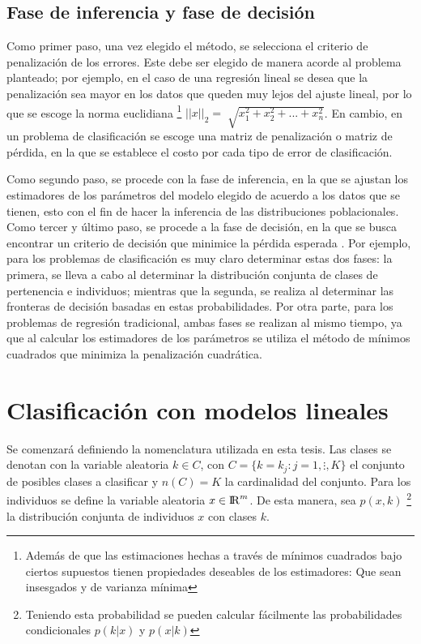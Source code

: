\subsection{Fase de inferencia y fase de decisión}

Como primer paso, una vez elegido el método, se selecciona el criterio de penalización de los errores. Este debe ser elegido de manera acorde al problema planteado; por ejemplo, en el caso de una regresión lineal se desea que la penalización sea mayor en los datos que queden muy lejos del ajuste lineal, por lo que se escoge la norma euclidiana \footnote{Además de que las estimaciones hechas a través de mínimos cuadrados bajo ciertos supuestos tienen propiedades deseables de los estimadores: Que sean insesgados y de varianza mínima} $||x||_2 = \sqrt[]{x_{1}^{2}+x_{2}^{2}+ ... + x_{n}^{2}}$. En cambio, en un problema de clasificación se escoge una matriz de penalización o matriz de pérdida, en la que se establece el costo por cada tipo de error de clasificación.

Como segundo paso, se procede con la fase de inferencia, en la que se ajustan los estimadores de los parámetros del modelo elegido de acuerdo a los datos que se tienen, esto con el fin de hacer la inferencia de las distribuciones poblacionales. Como tercer y último paso, se procede a la fase de decisión, en la que se busca encontrar un criterio de decisión que minimice la pérdida esperada \cite{bishop2006pattern}. Por ejemplo, para los problemas de clasificación es muy claro determinar estas dos fases: la primera, se lleva a cabo al determinar la distribución conjunta de clases de pertenencia e individuos; mientras que la segunda, se realiza al determinar las fronteras de decisión basadas en estas probabilidades. Por otra parte, para los problemas de regresión tradicional, ambas fases se realizan al mismo tiempo, ya que al calcular los estimadores de los parámetros se utiliza el método de mínimos cuadrados que minimiza la penalización cuadrática.


\section{Clasificación con modelos lineales}


Se comenzará definiendo la nomenclatura utilizada en esta tesis. Las clases se denotan con la variable aleatoria $k \in C$, con $C  = \{ k = k_j: j = 1, \vdots, K\}$ el conjunto de posibles clases a clasificar y $n(C) = K$ la cardinalidad del conjunto. Para los individuos se define la variable aleatoria $x \in {\rm I\!R}^{m}$. De esta manera, sea $p(x, k)$ \footnote{Teniendo esta probabilidad se pueden calcular fácilmente las probabilidades condicionales $p(k|x)$ y $p(x|k)$} la distribución conjunta de individuos $x$ con clases $k$.


